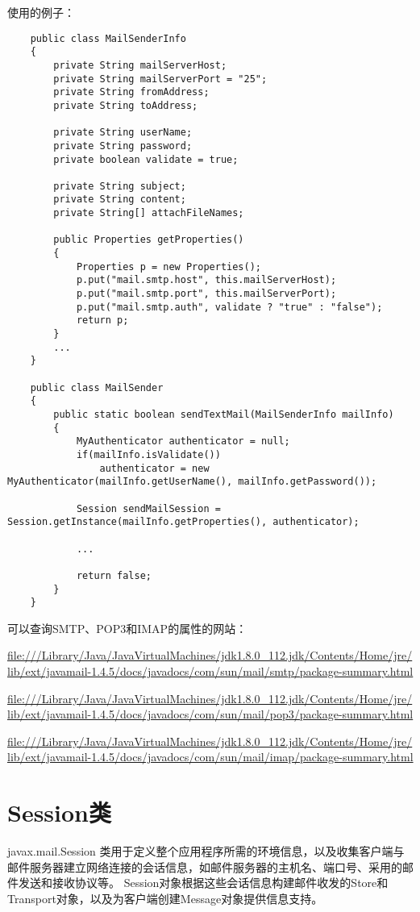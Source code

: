 \documentclass[a4paper,left=2.5cm,right=2.5cm,11pt]{article}
\begin{document}
	使用的例子：
	\begin{lstlisting}
	public class MailSenderInfo
	{
		private String mailServerHost;
		private String mailServerPort = "25";
		private String fromAddress;
		private String toAddress;

		private String userName;
		private String password;
		private boolean validate = true;

		private String subject;
		private String content;
		private String[] attachFileNames;

		public Properties getProperties()
		{
			Properties p = new Properties();
			p.put("mail.smtp.host", this.mailServerHost);
			p.put("mail.smtp.port", this.mailServerPort);
			p.put("mail.smtp.auth", validate ? "true" : "false");
			return p;
		}
		...
	}

	public class MailSender
	{
		public static boolean sendTextMail(MailSenderInfo mailInfo)
		{
			MyAuthenticator authenticator = null;
			if(mailInfo.isValidate())
				authenticator = new MyAuthenticator(mailInfo.getUserName(), mailInfo.getPassword());

			Session sendMailSession = Session.getInstance(mailInfo.getProperties(), authenticator);

			...

			return false;
		}
	}
	\end{lstlisting}

	可以查询SMTP、POP3和IMAP的属性的网站：\par
	\url{file:///Library/Java/JavaVirtualMachines/jdk1.8.0_112.jdk/Contents/Home/jre/lib/ext/javamail-1.4.5/docs/javadocs/com/sun/mail/smtp/package-summary.html}\par
	\url{file:///Library/Java/JavaVirtualMachines/jdk1.8.0_112.jdk/Contents/Home/jre/lib/ext/javamail-1.4.5/docs/javadocs/com/sun/mail/pop3/package-summary.html}\par
	\url{file:///Library/Java/JavaVirtualMachines/jdk1.8.0_112.jdk/Contents/Home/jre/lib/ext/javamail-1.4.5/docs/javadocs/com/sun/mail/imap/package-summary.html}

\section{Session类}
	javax.mail.Session 类用于定义整个应用程序所需的环境信息，以及收集客户端与邮件服务器建立网络连接的会话信息，如邮件服务器的主机名、端口号、采用的邮件发送和接收协议等。
	Session对象根据这些会话信息构建邮件收发的Store和Transport对象，以及为客户端创建Message对象提供信息支持。
\end{document}
